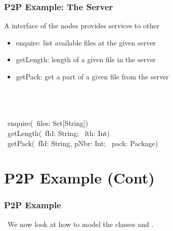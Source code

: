 \documentclass[handout]
{beamer}
\begin{document}
\begin{frame}
\frametitle{P2P Example: The Server}
A  interface of the nodes provides services to other 
\begin{itemize}
\item enquire: list available files at the given server
\item getLength: length of a given file in the server
\item getPack: get a part of a given file from the server
\end{itemize}

\bigskip
\pause

\begin{small}
\INTERFACE\ \\
\BEGIN\\
\innrykk \WITH\ \\
\innrykk \innrykk \OP\ enquire(\OUT\ files: Set[String])\\
\innrykk \innrykk \OP\ getLength(\IN\ fId: String; \OUT\ lth: Int)\\
\innrykk \innrykk \OP\ getPack(\IN\ fId: String, pNbr: Int; \OUT\ pack: Package)\\
\END
\end{small}
\end{frame}


\section{P2P Example (Cont)}
\begin{frame}
\frametitle{P2P Example}
\
We now look at how to model the classes  and .
\end{frame}
\end{document}
